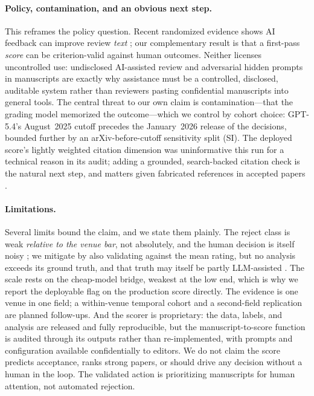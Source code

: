 \paragraph{Policy, contamination, and an obvious next step.}
This reframes the policy question. Recent randomized evidence shows AI feedback can improve
review \emph{text} \citep{thakkar2026feedback}; our complementary result is that a first-pass
\emph{score} can be criterion-valid against human outcomes. Neither licenses uncontrolled use:
undisclosed AI-assisted review \citep{russolatona2024lottery} and adversarial hidden prompts in
manuscripts \citep{lin2025hidden} are exactly why assistance must be a controlled, disclosed,
auditable system rather than reviewers pasting confidential manuscripts into general tools. The
central threat to our own claim is contamination---that the grading model memorized the
outcome---which we control by cohort choice: GPT-5.4's August~2025 cutoff \citep{openai2026gpt54}
precedes the January~2026 release of the decisions, bounded further by an arXiv-before-cutoff
sensitivity split (SI). The deployed score's lightly weighted citation dimension was
uninformative this run for a technical reason in its audit; adding a grounded, search-backed
citation check is the natural next step, and matters given fabricated references in accepted
papers \citep{neurips2025citations}.

\paragraph{Limitations.}
\label{sec:limits}%
Several limits bound the claim, and we state them plainly. The reject class is weak
\emph{relative to the venue bar}, not absolutely, and the human decision is itself noisy
\citep{cortes2021inconsistency,beygelzimer2023arbitrary}; we mitigate by also validating against
the mean rating, but no analysis exceeds its ground truth, and that truth may itself be partly
LLM-assisted \citep{liang2024monitoring}. The scale rests on the cheap-model bridge, weakest at
the low end, which is why we report the deployable flag on the production score directly. The
evidence is one venue in one field; a within-venue temporal cohort and a second-field
replication are planned follow-ups. And the scorer is proprietary: the data, labels, and
analysis are released and fully reproducible, but the manuscript-to-score function is audited
through its outputs rather than re-implemented, with prompts and configuration available
confidentially to editors. We do not claim the score predicts acceptance, ranks strong papers,
or should drive any decision without a human in the loop. The validated action is prioritizing
manuscripts for human attention, not automated rejection.
